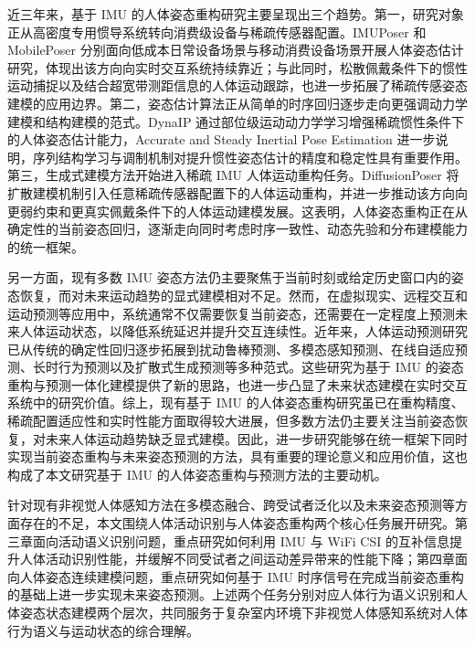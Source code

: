 近三年来，基于 IMU 的人体姿态重构研究主要呈现出三个趋势。第一，研究对象正从高密度专用惯导系统转向消费级设备与稀疏传感器配置。IMUPoser 和 MobilePoser 分别面向低成本日常设备场景与移动消费设备场景开展人体姿态估计研究，体现出该方向向实时交互系统持续靠近\cite{mollyn2023imuposer,xu2024mobileposer}；与此同时，松散佩戴条件下的惯性运动捕捉以及结合超宽带测距信息的人体运动跟踪，也进一步拓展了稀疏传感姿态建模的应用边界\cite{ilic2025human,armani2024ultra}。第二，姿态估计算法正从简单的时序回归逐步走向更强调动力学建模和结构建模的范式。DynaIP 通过部位级运动动力学学习增强稀疏惯性条件下的人体姿态估计能力，Accurate and Steady Inertial Pose Estimation 进一步说明，序列结构学习与调制机制对提升惯性姿态估计的精度和稳定性具有重要作用\cite{zhang2024dynamic,wu2024accurate}。第三，生成式建模方法开始进入稀疏 IMU 人体运动重构任务。DiffusionPoser 将扩散建模机制引入任意稀疏传感器配置下的人体运动重构，并进一步推动该方向向更弱约束和更真实佩戴条件下的人体运动建模发展\cite{van2024diffusionposer,ilic2025human}。这表明，人体姿态重构正在从确定性的当前姿态回归，逐渐走向同时考虑时序一致性、动态先验和分布建模能力的统一框架。

另一方面，现有多数 IMU 姿态方法仍主要聚焦于当前时刻或给定历史窗口内的姿态恢复，而对未来运动趋势的显式建模相对不足。然而，在虚拟现实、远程交互和运动预测等应用中，系统通常不仅需要恢复当前姿态，还需要在一定程度上预测未来人体运动状态，以降低系统延迟并提升交互连续性。近年来，人体运动预测研究已从传统的确定性回归逐步拓展到扰动鲁棒预测、多模态感知预测、在线自适应预测、长时行为预测以及扩散式生成预测等多种范式\cite{chen2023humanmac,yue2024human,lou2024multimodal,sun2024moml,yan2024forecasting,diller2024futurehuman3d,sun2025lal,curreli2025nonisotropic,yu2025vision}。这些研究为基于 IMU 的姿态重构与预测一体化建模提供了新的思路，也进一步凸显了未来状态建模在实时交互系统中的研究价值。综上，现有基于 IMU 的人体姿态重构研究虽已在重构精度、稀疏配置适应性和实时性能方面取得较大进展，但多数方法仍主要关注当前姿态恢复，对未来人体运动趋势缺乏显式建模。因此，进一步研究能够在统一框架下同时实现当前姿态重构与未来姿态预测的方法，具有重要的理论意义和应用价值，这也构成了本文研究基于 IMU 的人体姿态重构与预测方法的主要动机。


针对现有非视觉人体感知方法在多模态融合、跨受试者泛化以及未来姿态预测等方面存在的不足，本文围绕人体活动识别与人体姿态重构两个核心任务展开研究。第三章面向活动语义识别问题，重点研究如何利用 IMU 与 WiFi CSI 的互补信息提升人体活动识别性能，并缓解不同受试者之间运动差异带来的性能下降；第四章面向人体姿态连续建模问题，重点研究如何基于 IMU 时序信号在完成当前姿态重构的基础上进一步实现未来姿态预测。上述两个任务分别对应人体行为语义识别和人体姿态状态建模两个层次，共同服务于复杂室内环境下非视觉人体感知系统对人体行为语义与运动状态的综合理解。

